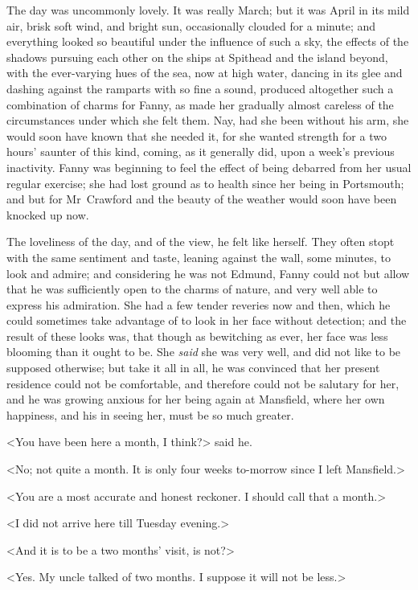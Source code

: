 The day was uncommonly lovely. It was really March; but it was April in its mild air, brisk soft wind, and bright sun, occasionally clouded for a minute; and everything looked so beautiful under the influence of such a sky, the effects of the shadows pursuing each other on the ships at Spithead and the island beyond, with the ever-varying hues of the sea, now at high water, dancing in its glee and dashing against the ramparts with so fine a sound, produced altogether such a combination of charms for Fanny, as made her gradually almost careless of the circumstances under which she felt them. Nay, had she been without his arm, she would soon have known that she needed it, for she wanted strength for a two hours' saunter of this kind, coming, as it generally did, upon a week's previous inactivity. Fanny was beginning to feel the effect of being debarred from her usual regular exercise; she had lost ground as to health since her being in Portsmouth; and but for Mr~Crawford and the beauty of the weather would soon have been knocked up now.

The loveliness of the day, and of the view, he felt like herself. They often stopt with the same sentiment and taste, leaning against the wall, some minutes, to look and admire; and considering he was not Edmund, Fanny could not but allow that he was sufficiently open to the charms of nature, and very well able to express his admiration. She had a few tender reveries now and then, which he could sometimes take advantage of to look in her face without detection; and the result of these looks was, that though as bewitching as ever, her face was less blooming than it ought to be. She \textit{said}  she was very well, and did not like to be supposed otherwise; but take it all in all, he was convinced that her present residence could not be comfortable, and therefore could not be salutary for her, and he was growing anxious for her being again at Mansfield, where her own happiness, and his in seeing her, must be so much greater.

<You have been here a month, I think?> said he.

<No; not quite a month. It is only four weeks to-morrow since I left Mansfield.>

<You are a most accurate and honest reckoner. I should call that a month.>

<I did not arrive here till Tuesday evening.>

<And it is to be a two months' visit, is not?>

<Yes. My uncle talked of two months. I suppose it will not be less.>

